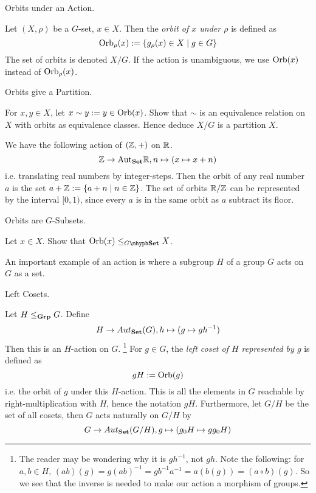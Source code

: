 \documentclass[../../book.tex]{subfiles}
\begin{document}
\begin{dfn} Orbits under an Action. 

    Let $(X, \rho)$ be a $G$-set, $x \in X$. 
    Then the \emph{orbit of $x$ under $\rho$} is defined as
    \[
        \mathrm{Orb}_\rho(x) := \{g_\rho(x) \in X \mid g \in G\}
    \]
    The set of orbits is denoted $X / G$.
    If the action is unambiguous, we use $\mathrm{Orb}(x)$ instead of $\mathrm{Orb}_\rho(x)$. 

\end{dfn}

\begin{ex} [Important] Orbits give a Partition.

    For $x, y \in X$, let $x \sim y := y \in \mathrm{Orb}(x)$. 
    Show that $\sim$ is an equivalence relation on $X$ 
    with orbits as equivalence classes.
    Hence deduce $X/G$ is a partition $X$. 
\end{ex}

\begin{eg}
    
    We have the following action of $(\mathbb{Z},+)$ on $\mathbb{R}$. \[
        \mathbb{Z} \to \mathrm{Aut}_{\mathbf{Set}}\mathbb{R}, n \mapsto (x \mapsto x + n)
    \]
    i.e. translating real numbers by integer-steps. 
    Then the orbit of any real number $a$ is 
    the set $a + \mathbb{Z} := \{a + n \mid n \in \mathbb{Z}\}$. 
    The set of orbits $\mathbb{R} / \mathbb{Z}$ can be represented by
    the interval $[0,1)$,
    since every $a$ is in the same orbit as $a$ subtract its floor.
    
\end{eg}

\begin{ex} Orbits are $G$-Subsets.

    Let $x \in X$. Show that $\Orb(x) \leq_{G\mhyph\Set} X$.
\end{ex}

An important example of an action is where
a subgroup $H$ of a group $G$ acts on $G$ as a set.

\begin{dfn} Left Cosets. 

    Let $H \leq_{\mathbf{Grp}} G$. 
    Define 
    \[H \to Aut_{\mathbf{Set}}(G), h \mapsto (g \mapsto gh^{-1})\]
    Then this is an $H$-action on $G$. \footnote{
        The reader may be wondering why it is $gh^{-1}$, not $gh$.
        Note the following: for $a, b \in H$, 
        $(ab)(g) = g(ab)^{-1} = gb^{-1}a^{-1} = a(b(g)) = (a \circ b)(g)$.
        So we see that the inverse is needed to make our action a morphism of groups.
    }
    For $g \in G$, 
    the \emph{left coset of $H$ represented by $g$} is defined as
    \[gH := \mathrm{Orb}(g)\]
    i.e. the orbit of $g$ under this $H$-action. 
    This is all the elements in $G$ reachable by 
    right-multiplication with $H$, hence the notation $gH$. 
    Furthermore, let $G / H$ be the set of all cosets, 
    then $G$ acts naturally on $G / H$ by
    \[G \to Aut_{\mathbf{Set}}(G / H), g \mapsto (g_0H \mapsto gg_0H)\]
\end{dfn}
\end{document}
